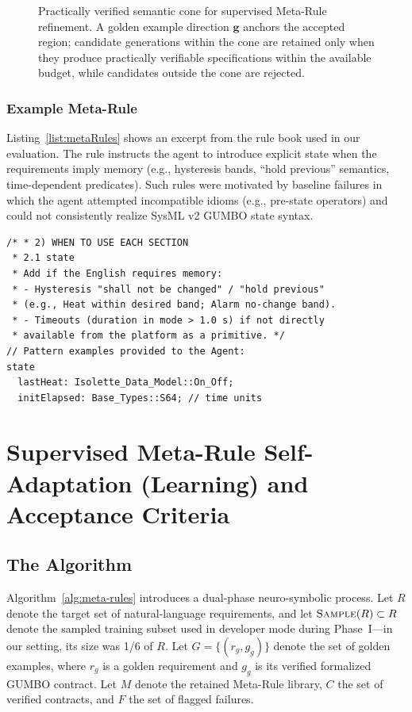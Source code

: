 \documentclass[conference]{IEEEtran}
\begin{document}
\begin{figure}[t]
\centering
\resizebox{\columnwidth}{!}{}
\caption{Practically verified semantic cone for supervised Meta-Rule refinement. A golden example direction $\mathbf{g}$ anchors the accepted region; candidate generations within the cone are retained only when they produce practically verifiable specifications within the available budget, while candidates outside the cone are rejected.}
\label{fig:vsc}
\vspace{-0.6em}
\end{figure}

\subsubsection{Example Meta-Rule}
Listing~\ref{list:metaRules} shows an excerpt from the rule book used in our evaluation. The rule instructs the agent to introduce explicit state when the requirements imply memory (e.g., hysteresis bands, ``hold previous'' semantics, time-dependent predicates). Such rules were motivated by baseline failures in which the agent attempted incompatible idioms (e.g., pre-state operators) and could not consistently realize SysML v2 GUMBO state syntax.

\begin{lstlisting}[caption={Extract from GUMBO FSE Agent Plan: Meta-Rules for State Formalization.}, label={list:metaRules}]
/* * 2) WHEN TO USE EACH SECTION
 * 2.1 state
 * Add if the English requires memory:
 * - Hysteresis "shall not be changed" / "hold previous" 
 * (e.g., Heat within desired band; Alarm no-change band).
 * - Timeouts (duration in mode > 1.0 s) if not directly 
 * available from the platform as a primitive. */
// Pattern examples provided to the Agent:
state
  lastHeat: Isolette_Data_Model::On_Off;
  initElapsed: Base_Types::S64; // time units
\end{lstlisting}

\section{Supervised Meta-Rule Self-Adaptation (Learning) and Acceptance Criteria}
\label{sec:meta-learning}
\subsection{The Algorithm}
\label{sec:algorithm-loop}
Algorithm~\ref{alg:meta-rules} introduces a dual-phase neuro-symbolic process. Let $R$ denote the target set of natural-language requirements, and let $\textsc{Sample}(R)\subset R$ denote the sampled training subset used in developer mode during Phase~I---in our setting, its size was 1/6 of $R$. Let $G=\{(r_g,g_g)\}$ denote the set of golden examples, where $r_g$ is a golden requirement and $g_g$ is its verified formalized GUMBO contract. Let $M$ denote the retained Meta-Rule library, $C$ the set of verified contracts, and $F$ the set of flagged failures.
\end{document}
